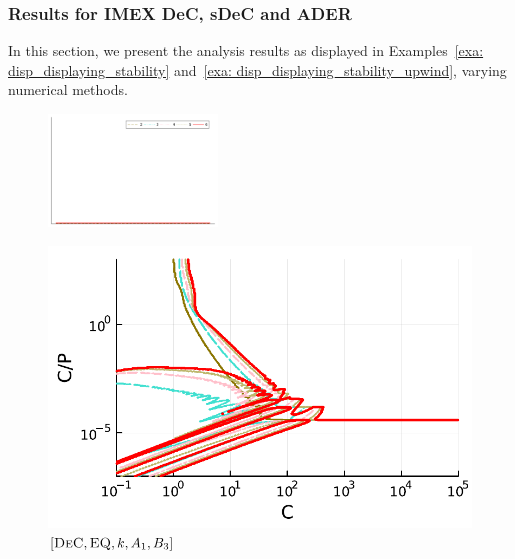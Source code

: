 
\subsubsection{Results for IMEX DeC, sDeC and ADER}
In this section, we present the analysis results as displayed in Examples~\ref{exa: disp_displaying_stability} and~\ref{exa: disp_displaying_stability_upwind}, varying numerical methods. 
\begin{figure}
	\centering
	\includegraphics[width=0.4\textwidth,trim={230 340 30 22}, clip]{pdf/pdepics/legends/colors_a-d_new_horiz_2-6_no_order.pdf}\\
	\begin{minipage}[t]{0.32\textwidth}
		\centering
		\includegraphics[width=\textwidth]{pdf/pdepics/disp/IMEXDeC_equispaced_disp_TMM_2-6_newE.pdf}
		\small$[\textsc{DeC}, \textsc{EQ},k,A_1,B_3]$\par
	\end{minipage}
	\begin{minipage}[t]{0.32\textwidth}
		\centering

\end{minipage}
\end{figure}
